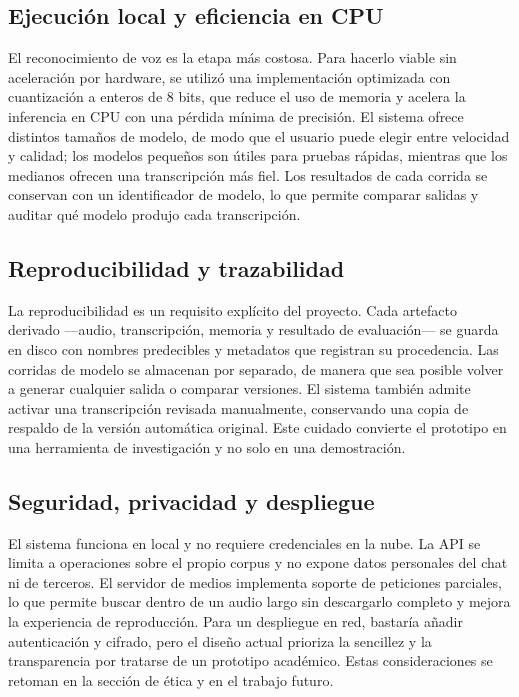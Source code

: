 \documentclass[12pt,a4paper]{article}
\begin{document}
\subsection{Ejecución local y eficiencia en CPU}

El reconocimiento de voz es la etapa más costosa. Para hacerlo viable sin aceleración por hardware, se utilizó una implementación optimizada con cuantización a enteros de 8 bits, que reduce el uso de memoria y acelera la inferencia en CPU con una pérdida mínima de precisión. El sistema ofrece distintos tamaños de modelo, de modo que el usuario puede elegir entre velocidad y calidad; los modelos pequeños son útiles para pruebas rápidas, mientras que los medianos ofrecen una transcripción más fiel. Los resultados de cada corrida se conservan con un identificador de modelo, lo que permite comparar salidas y auditar qué modelo produjo cada transcripción.

\subsection{Reproducibilidad y trazabilidad}

La reproducibilidad es un requisito explícito del proyecto. Cada artefacto derivado —audio, transcripción, memoria y resultado de evaluación— se guarda en disco con nombres predecibles y metadatos que registran su procedencia. Las corridas de modelo se almacenan por separado, de manera que sea posible volver a generar cualquier salida o comparar versiones. El sistema también admite activar una transcripción revisada manualmente, conservando una copia de respaldo de la versión automática original. Este cuidado convierte el prototipo en una herramienta de investigación y no solo en una demostración.

\subsection{Seguridad, privacidad y despliegue}

El sistema funciona en local y no requiere credenciales en la nube. La API se limita a operaciones sobre el propio corpus y no expone datos personales del chat ni de terceros. El servidor de medios implementa soporte de peticiones parciales, lo que permite buscar dentro de un audio largo sin descargarlo completo y mejora la experiencia de reproducción. Para un despliegue en red, bastaría añadir autenticación y cifrado, pero el diseño actual prioriza la sencillez y la transparencia por tratarse de un prototipo académico. Estas consideraciones se retoman en la sección de ética y en el trabajo futuro.
\end{document}
